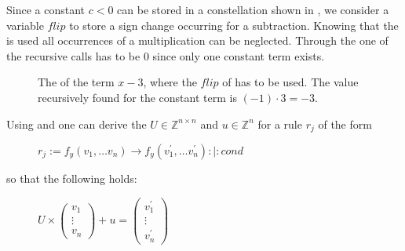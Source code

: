 Since a constant $c < 0$ can be stored in a constellation shown in , we consider a variable $flip$ to store a sign change occurring for a subtraction. Knowing that the \stdLinInt is used all occurrences of a multiplication can be neglected.\newline %
Through the \stdLinInt one of the recursive calls has to be $0$ since only one constant term exists.

\begin{figure}
	\centering
	\caption{The \rpntree of the term $x-3$, where the $flip$ of  has to be used. The value recursively found for the constant term is $(-1)\cdot 3 = -3$.}
	\label{ex:constant-term-minus}
\end{figure}

\FloatBarrier

Using  and  one can derive the \updatematrix $U \in \mathbb{Z}^{n\times n}$ and \updateconstants $u \in \mathbb{Z}^n$ for a rule $r_j$ of the form
\begin{figure}[H]
	\centering
	$r_j:= f_y(v_1,\dots v_n) \rightarrow f_y(v^\prime_1,\dots v^\prime_n) :|: cond$
\end{figure}  
so that the following holds:
\begin{figure}[H]
	\centering
	$U \times \begin{pmatrix} v_1 \\ \vdots \\ v_n \end{pmatrix} + u = \begin{pmatrix} v^\prime_1 \\ \vdots \\ v^\prime_n \end{pmatrix}$
\end{figure}

